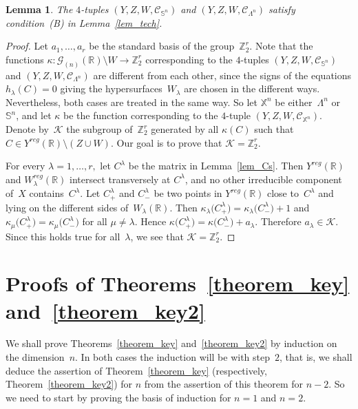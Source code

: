 \documentclass[reqno,tbtags,12pt]{amsart}
\numberwithin{equation}{section}
\newcommand{\R}{\mathbb{R}}
\newcommand{\CC}{\mathcal{C}}
\newcommand{\Z}{\mathbb{Z}}
\newcommand{\X}{\mathbb{X}}
\newcommand{\bS}{\mathbb{S}}
\newcommand{\CG}{\mathcal{G}}
\newtheorem{lem}[theorem]{Lemma}
\theoremstyle{definition}
\begin{document}
{\sloppy
\begin{lem}
The $4$-tuples\/ $(Y,Z,W,\CC_{\bS^n})$ and\/ $(Y,Z,W,\CC_{\Lambda^n})$ satisfy condition\/~\textnormal{(B)} in Lemma~\ref{lem_tech}.
\end{lem}


\begin{proof}
Let $a_1,\ldots,a_r$ be the standard basis of the group~$\Z_2^r$. Note that the functions $\kappa\colon \CG_{(n)}(\R)\setminus W\to\Z_2^r$ corresponding to the $4$-tuples $(Y,Z,W,\CC_{\bS^n})$ and $(Y,Z,W,\CC_{\Lambda^n})$ are different from each other, since the signs of the equations $h_{\lambda}(C)=0$ giving the hypersurfaces~$W_{\lambda}$  are chosen in the different ways. Nevertheless, both cases are treated in the same way. So let $\X^n$ be either~$\Lambda^n$ or~$\bS^n$, and let $\kappa$ be the function corresponding to the $4$-tuple $(Y,Z,W,\CC_{\X^n})$. Denote by~$\mathcal{K}$ the subgroup of~$\Z_2^r$ generated by all $\kappa(C)$ such that $C\in Y^{reg}(\R)\setminus(Z\cup W)$. Our goal is to prove that $\mathcal{K}=\Z_2^r$.

For every $\lambda=1,\ldots,r,$  let $C^{\lambda}$ be the matrix in Lemma~\ref{lem_Cs}. Then $Y^{reg}(\R)$ and $W_{\lambda}^{reg}(\R)$ intersect transversely at $C^{\lambda}$, and no other irreducible component of~$X$ contains~$C^{\lambda}$. Let $C^{\lambda}_+$ and $C^{\lambda}_-$ be two points in $Y^{reg}(\R)$ close to~$C^{\lambda}$ and lying on the different sides of~$W_{\lambda}(\R)$. Then $\kappa_{\lambda}\bigl(C^{\lambda}_+\bigr)=\kappa_{\lambda}\bigl(C^{\lambda}_-\bigr)+1$ and $\kappa_{\mu}\bigl(C^{\lambda}_+\bigr)=\kappa_{\mu}\bigl(C^{\lambda}_-\bigr)$ for all $\mu\ne\lambda$. Hence $\kappa\bigl(C^{\lambda}_+\bigr)= \kappa\bigl(C^{\lambda}_-\bigr)+a_{\lambda}$. Therefore $a_{\lambda}\in\mathcal{K}$. Since this holds true for all~$\lambda$, we see that $\mathcal{K}=\Z_2^r$.
\end{proof}

}

\section{Proofs of Theorems~\ref{theorem_key} and~\ref{theorem_key2}}\label{section_proof_key}

We shall prove Theorems~\ref{theorem_key} and~\ref{theorem_key2} by induction on the dimension~$n$. In both cases the induction will be with step~$2$, that is, we shall deduce the assertion of Theorem~\ref{theorem_key} (respectively, Theorem~\ref{theorem_key2}) for $n$ from the assertion of this theorem for $n-2$. So we need to start by proving the basis  of induction for $n=1$ and $n=2$.
\end{document}
